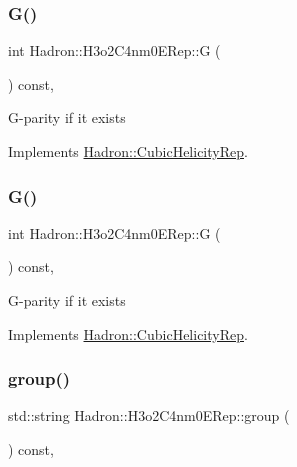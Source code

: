 \subsubsection{\texorpdfstring{G()}{G()}\hspace{0.1cm}{\footnotesize\ttfamily [2/3]}}
{\footnotesize\ttfamily int Hadron\+::\+H3o2\+C4nm0\+E\+Rep\+::G (\begin{DoxyParamCaption}{ }\end{DoxyParamCaption}) const\hspace{0.3cm}{\ttfamily [inline]}, {\ttfamily [virtual]}}

G-\/parity if it exists 

Implements \mbox{\hyperlink{structHadron_1_1CubicHelicityRep_a50689f42be1e6170aa8cf6ad0597018b}{Hadron\+::\+Cubic\+Helicity\+Rep}}.

\mbox{\label{structHadron_1_1H3o2C4nm0ERep_a0dbed874e65f17f90f2b09c97b54f679}} 
\subsubsection{\texorpdfstring{G()}{G()}\hspace{0.1cm}{\footnotesize\ttfamily [3/3]}}
{\footnotesize\ttfamily int Hadron\+::\+H3o2\+C4nm0\+E\+Rep\+::G (\begin{DoxyParamCaption}{ }\end{DoxyParamCaption}) const\hspace{0.3cm}{\ttfamily [inline]}, {\ttfamily [virtual]}}

G-\/parity if it exists 

Implements \mbox{\hyperlink{structHadron_1_1CubicHelicityRep_a50689f42be1e6170aa8cf6ad0597018b}{Hadron\+::\+Cubic\+Helicity\+Rep}}.

\mbox{\label{structHadron_1_1H3o2C4nm0ERep_a2fe0c5a9224b4ed20f8e294547091975}} 
\subsubsection{\texorpdfstring{group()}{group()}\hspace{0.1cm}{\footnotesize\ttfamily [1/3]}}
{\footnotesize\ttfamily std\+::string Hadron\+::\+H3o2\+C4nm0\+E\+Rep\+::group (\begin{DoxyParamCaption}{ }\end{DoxyParamCaption}) const\hspace{0.3cm}{\ttfamily [inline]}, {\ttfamily [virtual]}}


